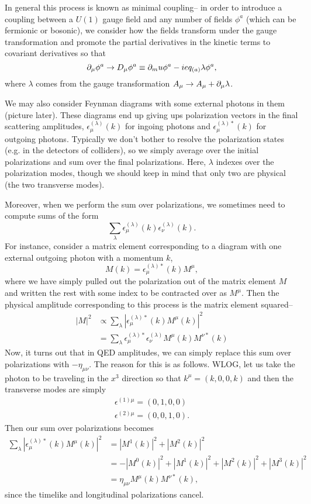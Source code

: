 In general this process is known as minimal coupling-- in order to introduce a coupling between a $U(1)$ gauge field and any number of fields $\phi^a$ (which can be fermionic or bosonic), we consider how the fields transform under the gauge transformation and promote the partial derivatives in the kinetic terms to covariant derivatives so that
$$\partial_\mu \phi^a \to D_\mu \phi^a \equiv \partial_mu \phi^a -ie q_{(a)} \lambda \phi^a,$$
where $\lambda$ comes from the gauge transformation $A_\mu \to A_\mu + \partial_\mu \lambda$.

We may also consider Feynman diagrams with some external photons in them (picture later).%
These diagrams end up giving ups polarization vectors in the final scattering amplitudes, $\epsilon_\mu^{(\lambda)}(k)$ for ingoing photons and $\epsilon_{\mu}^{(\lambda)*}(k)$ for outgoing photons. Typically we don't bother to resolve the polarization states (e.g. in the detectors of colliders), so we simply average over the initial polarizations and sum over the final polarizations. Here, $\lambda$ indexes over the polarization modes, though we should keep in mind that only two are physical (the two transverse modes).

Moreover, when we perform the sum over polarizations, we sometimes need to compute sums of the form 
$$\sum_\lambda \epsilon_{\mu}^{(\lambda)}(k) \epsilon_{\nu}^{(\lambda)}(k).$$ For instance, consider a matrix element corresponding to a diagram with one external outgoing photon with a momentum $k$,
\begin{equation}
    M(k)=\epsilon_\mu^{(\lambda)*} (k) M^\mu,
\end{equation}
where we have simply pulled out the polarization out of the matrix element $M$ and written the rest with some index to be contracted over as $M^\mu$. Then the physical amplitude corresponding to this process is the matrix element squared--
\begin{align*}
    |M|^2 &\propto \sum_\lambda |\epsilon_\mu^{(\lambda)*} (k)M^\mu (k)|^2\\
    &= \sum_\lambda \epsilon_\mu^{(\lambda)*} \epsilon_\nu^{(\lambda)} M^\mu(k) M^{\nu *}(k)
\end{align*}
Now, it turns out that in QED amplitudes, we can simply replace this sum over polarizations with $-\eta_{\mu\nu}$. The reason for this is as follows. WLOG, let us take the photon to be traveling in the $x^3$ direction so that $k^\mu=(k,0,0,k)$ and then the transverse modes are simply
\begin{align*}
    \epsilon^{(1)\mu}=(0,1,0,0)\\
    \epsilon^{(2)\mu}=(0,0,1,0).
\end{align*}
Then our sum over polarizations becomes
\begin{align*}
    \sum_\lambda |\epsilon_\mu^{(\lambda)*} (k)M^\mu (k)|^2 &= |M^1(k)|^2 + |M^2(k)|^2\\
    &=-|M^0(k)|^2 + |M^1(k)|^2 + |M^2(k)|^2 + |M^3(k)|^2\\
    &= \eta_{\mu\nu} M^\mu(k) M^{\nu*}(k),
\end{align*}
since the timelike and longitudinal polarizations cancel.%
